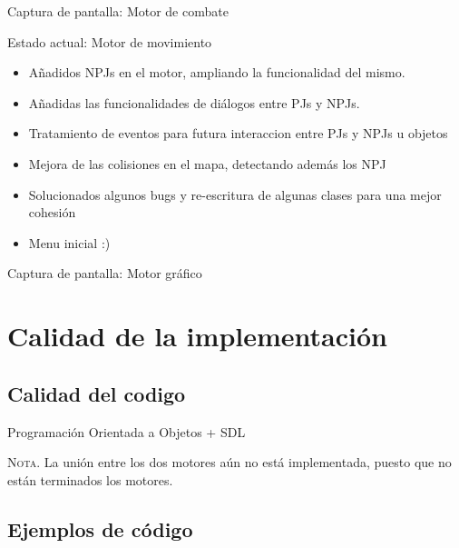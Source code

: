 \documentclass[9pt,xcolor=svgnames]{beamer}
\begin{document}
   \begin{frame}{Captura de pantalla: Motor de combate}
    
   \end{frame}

   \begin{frame}{Estado actual: Motor de movimiento}
    \begin{itemize}
     \item Añadidos NPJs en el motor, ampliando la funcionalidad del mismo.
     \item Añadidas las funcionalidades de diálogos entre PJs y NPJs.
     \item Tratamiento de eventos para futura interaccion entre PJs y
	   NPJs u objetos
     \item Mejora de las colisiones en el mapa, detectando además los NPJ
     \item Solucionados algunos bugs y re-escritura de algunas clases
	   para una mejor cohesión
     \item Menu inicial :)
    \end{itemize}
   \end{frame}


   \begin{frame}{Captura de pantalla: Motor gráfico}
    
   \end{frame}



 \section{Calidad de la implementación}
 
  \subsection{Calidad del codigo}
  
  \begin{frame}{Programación Orientada a Objetos + SDL}   
   
   
   \textsc{Nota.} La unión entre los dos motores aún no está
   implementada, puesto que no están terminados los motores.

  \end{frame}
  
  
  \subsection{Ejemplos de código}
  
\end{document}

